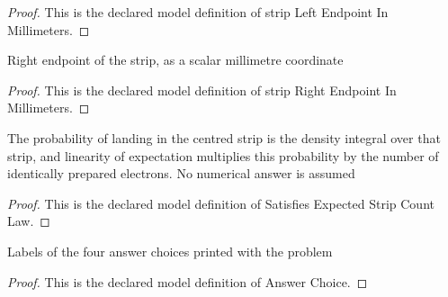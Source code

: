 \begin{proof}
  This is the declared model definition of strip Left Endpoint In Millimeters.
\end{proof}
\begin{definition}
  \label{def:physics:phyx-mini-0501:phyxminiproblems-problemphyxmini0501-striprightendpointinmillimeters}
  Right endpoint of the strip, as a scalar millimetre coordinate
\end{definition}
\begin{proof}
  This is the declared model definition of strip Right Endpoint In Millimeters.
\end{proof}
\begin{definition}
  \label{def:physics:phyx-mini-0501:phyxminiproblems-problemphyxmini0501-satisfiesexpectedstripcountlaw}
  The probability of landing in the centred strip is the density integral over that strip, and linearity of expectation multiplies this probability by the number of identically prepared electrons. No numerical answer is assumed
\end{definition}
\begin{proof}
  This is the declared model definition of Satisfies Expected Strip Count Law.
\end{proof}
\begin{definition}
  \label{def:physics:phyx-mini-0501:phyxminiproblems-problemphyxmini0501-answerchoice}
  Labels of the four answer choices printed with the problem
\end{definition}
\begin{proof}
  This is the declared model definition of Answer Choice.
\end{proof}
